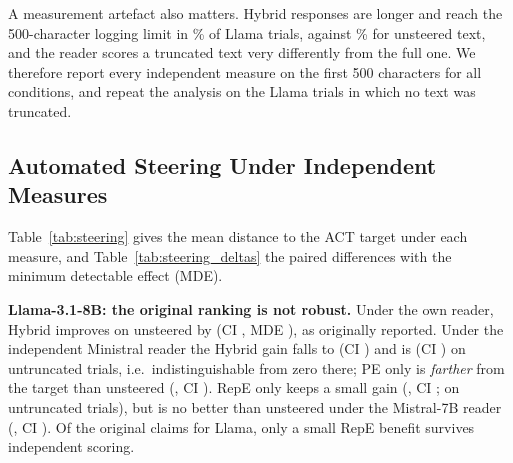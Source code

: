 \documentclass[letterpaper]{article} %
\begin{document}
A measurement artefact also matters. Hybrid responses are longer and reach the 500-character logging limit in \TruncLlamaHybrid\% of Llama trials, against \TruncLlamaUnst\% for unsteered text, and the reader scores a truncated text very differently from the full one. We therefore report every independent measure on the first 500 characters for all conditions, and repeat the analysis on the \UntrLlamaN{} Llama trials in which no text was truncated.

\subsection{Automated Steering Under Independent Measures}

Table~\ref{tab:steering} gives the mean distance to the ACT target under each measure, and Table~\ref{tab:steering_deltas} the paired differences with the minimum detectable effect (MDE).

\begin{table}[t]
\centering
\caption{Mean overall distance to ACT targets ($\downarrow$ better), 1,300 trials per model. ``Own reader'' is the original measure (full text); the other rows use the first 500 characters and readers built on other models (Mistral-7B scores E and A only).}
\label{tab:steering}
\small

\end{table}

\begin{table}[t]
\centering
\caption{Paired change in distance to the ACT target relative to unsteered (negative = closer), with 95\% cluster-bootstrap CI over scenarios and minimum detectable effect (80\% power).}
\label{tab:steering_deltas}
\small

\end{table}

\textbf{Llama-3.1-8B: the original ranking is not robust.} Under the own reader, Hybrid improves on unsteered by \DeltaLlamaOrigHybrid{} (CI \DeltaLlamaOrigHybridCi, MDE \DeltaLlamaOrigHybridMde), as originally reported. Under the independent Ministral reader the Hybrid gain falls to \DeltaLlamaCrossHybrid{} (CI \DeltaLlamaCrossHybridCi) and is \UntrLlamaCrossHybrid{} (CI \UntrLlamaCrossHybridCi) on untruncated trials, i.e.\ indistinguishable from zero there; PE only is \emph{farther} from the target than unsteered (\DeltaLlamaCrossPeonly, CI \DeltaLlamaCrossPeonlyCi). RepE only keeps a small gain (\DeltaLlamaCrossRepeonly, CI \DeltaLlamaCrossRepeonlyCi; \UntrLlamaCrossRepeonly{} on untruncated trials), but is no better than unsteered under the Mistral-7B reader (\DeltaLlamaMSevenbRepeonly, CI \DeltaLlamaMSevenbRepeonlyCi). Of the original claims for Llama, only a small RepE benefit survives independent scoring.
\end{document}
